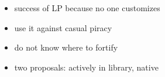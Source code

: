 \begin{itemize}
  \item success of LP because no one customizes
  \item use it against casual piracy
  \item do not know where to fortify
  \item two proposals: actively in library, native
\end{itemize}
